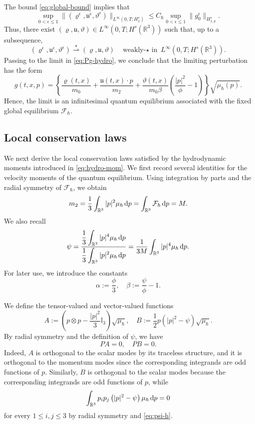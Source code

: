 \documentclass[10pt,reqno]{amsart}
\numberwithin{equation}{section}
\newcommand{\lt}{\left}
\newcommand{\rt}{\right}
\newcommand{\mR}{\mathbb{R}}
\newcommand{\vrh}{\varrho}
\newcommand{\vth}{\vartheta}
\newcommand{\mfu}{\mathfrak{u}}
\newcommand{\intr}{\int_{\mR^3}}
\newcommand{\R}{\mathbb R}
\newcommand{\bq}{\begin{equation}}
\newcommand{\eq}{\end{equation}}
\newcommand{\calF}{\mathcal F}
\newcommand{\rdp}{\textnormal{d}p}
\begin{document}
The bound \eqref{eq:global-bound} implies that
\bq\label{eq:hydro-bound}
\sup_{0<\epsilon\le1}\|(\vrh^\epsilon,\mfu^\epsilon,\vth^\epsilon)\|_{L^\infty(0,T;H^s_x)}\le C_\hbar
\sup_{0<\epsilon\le1}
\|
g^\epsilon_0
\|_{H^s_{x,p}}.
\eq
Thus, there exist $(\vrh,\mfu,\vth)\in L^\infty (0,T;H^s(\R^3))$ such that, up to a subsequence,
\bq\label{eq:hydro-wk}
(\vrh^\epsilon,\mfu^\epsilon,\vth^\epsilon)\overset{\star}{\rightharpoonup}(\vrh,\mfu,\vth)\quad\text{weakly-$\star$ in }L^\infty(0,T;H^s(\R^3)).
\eq
Passing to the limit in \eqref{eq:Pg-hydro}, we conclude that the limiting perturbation has the form
\bq\label{eq:inf-qe}
g(t,x,p)=\lt\{\frac{\vrh(t,x)}{m_0 }+\frac{\mfu(t,x)\cdot p}{m_2 }+\frac{\vth(t,x)}{m_0\beta}\lt(\frac{|p|^2}{\phi }-1\rt)\rt\}\sqrt{\mu_\hbar(p)}.
\eq
Hence, the limit is an infinitesimal quantum equilibrium associated with the fixed global equilibrium $\calF_\hbar$.

%
%
%
%
%
%
%
%
%
%
\subsection{Local conservation laws}

We next derive the local conservation laws satisfied by the hydrodynamic moments introduced in \eqref{eq:hydro-mom}. We first record several identities for the velocity moments of the quantum equilibrium. Using integration by parts and the radial symmetry of $\calF_\hbar$, we obtain
\[
m_2 =\frac{1}{3}\intr |p|^2\mu_\hbar\,\rdp=\intr \calF_\hbar\,\rdp=M .
\]
We also recall
\bq\label{eq:psi-h}
\psi =\frac{\displaystyle\frac{1}{3}\intr |p|^4\mu_\hbar\,\rdp}{\displaystyle\frac{1}{3}\intr |p|^2\mu_\hbar\,\rdp}=\frac{1}{3M }\intr |p|^4\mu_\hbar\,\rdp.
\eq
For later use, we introduce the constants
\bq\label{eq:alpha-beta}
\alpha:=\frac{\phi }{3}, \quad \beta :=\frac{\psi }{\phi }-1.
\eq

We define the tensor-valued and vector-valued functions
\bq\label{eq:AB-h}
A :=\lt(p\otimes p-\frac{|p|^2}{3}\mathbb I_3\rt)\sqrt{\mu_\hbar},
\quad
B :=\frac{1}{2}p\lt(|p|^2-\psi \rt)\sqrt{\mu_\hbar}.
\eq
By radial symmetry and the definition of $\psi $, we have
\bq\label{eq:AB-micro}
P A =0, \quad P B =0.
\eq
Indeed, $A$ is orthogonal to the scalar modes by its traceless structure, and it is orthogonal to the momentum modes since the corresponding integrands are odd functions of $p$. Similarly, $B$ is orthogonal to the scalar modes because the corresponding integrands are odd functions of $p$, while
\[
\intr p_i p_j\lt(|p|^2-\psi \rt)\mu_\hbar\,\rdp=0
\]
for every $1\le i,j\le3$ by radial symmetry and \eqref{eq:psi-h}.
\end{document}
